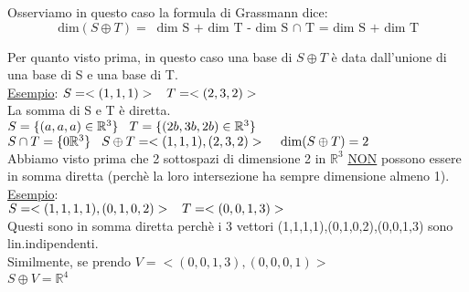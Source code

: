 \textsf{\small Osserviamo in questo caso la formula di Grassmann dice:}
\[
\text{ dim}(S \oplus T) = \text{ dim S + dim T - dim S $\cap$ T = dim S + dim T}
\]

\textsf{\small Per quanto visto prima, in questo caso una base di $S \oplus T$ è data dall'unione di una base di S e una base di T.}\\

\textsf{\underline{Esempio}:} $S = <(1,1,1)> \hspace{0.3cm} T = <(2,3,2)>$\\
\textsf{\small La somma di S e T è diretta.}\\
\(
S = \{ (a,a,a) \in \mathbb{R}^3\} \hspace{0.3cm} T = \{ (2b,3b,2b) \in \mathbb{R}^3\}
\)\\
$S \cap T = \{ 0\mathbb{R}^3\} \hspace{0.3cm} S \oplus T = <(1,1,1),(2,3,2)> \hspace{0.3cm} \text{ dim}(S \oplus T) = 2$\\

\textsf{\small Abbiamo visto prima che 2 sottospazi di dimensione 2 in $\mathbb{R}^3$ \underline{NON} possono essere in somma diretta (perchè la loro intersezione ha sempre dimensione almeno 1).}\\

\textsf{\underline{Esempio}:}\\
$S = <(1,1,1,1),(0,1,0,2)> \hspace{0.3cm} T = <(0,0,1,3)>$\\
\textsf{\small Questi sono in somma diretta perchè i 3 vettori (1,1,1,1),(0,1,0,2),(0,0,1,3) sono lin.indipendenti.}\\
\textsf{\small Similmente, se prendo $V = <(0,0,1,3),(0,0,0,1)>$}\\
$S \oplus V = \mathbb{R}^4$\\
